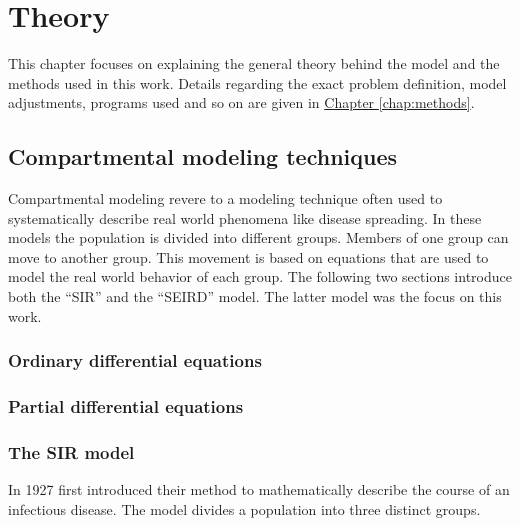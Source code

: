 
\chapter{Theory} %
This chapter focuses on explaining the general theory behind the model and the methods used in this work.
Details regarding the exact problem definition, model adjustments, programs used and so on are given in
\hyperref[chap:methods]{Chapter \ref*{chap:methods}}.


\label{chap:theory} %


\section{Compartmental modeling techniques}
Compartmental modeling revere to a modeling technique often used to systematically describe real world phenomena
like disease spreading\cite{compartementMod}. In these models the population is divided into different groups. 
Members of one group can move to another group. This movement is based on equations that are used to model the real
world behavior of each group. The following two sections introduce both the ``SIR'' and the ``SEIRD'' model. The
latter model was the focus on this work.

\subsection{Ordinary differential equations}

\subsection{Partial differential equations}


\subsection{The SIR model}
\label{sec:SIR}
In 1927 \cite{kermack1991contributions} first introduced their method to mathematically describe  
the course  of an infectious disease. The model divides a population into three distinct groups.

